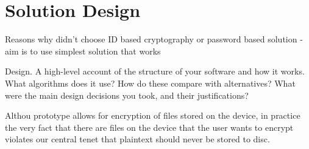 
\chapter{Solution Design}
\label{cha:design}
Reasons why didn't choose ID based cryptography or password based solution - aim is to use simplest solution that works

Design. A high-level account of the structure of your software and how it works. What algorithms does it use? How do these compare with alternatives? What were the main design decisions you took, and their justifications? 

Althou prototype allows for encryption of files stored on the device, in practice the very fact that there are files on the device that the user wants to encrypt violates our central tenet that plaintext should never be stored to disc. 
